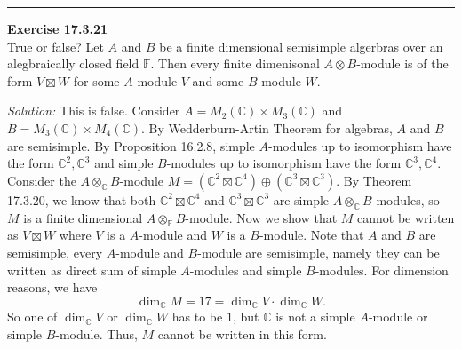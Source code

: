 \documentclass[a4paper, 12pt]{article}
\newenvironment{problem}[2][Exercise]
    { \begin{mdframed}[backgroundcolor=gray!20] \textbf{#1 #2} \\}
    {  \end{mdframed}}
\newenvironment{solution}
    {\textit{Solution:}}
    {}
\begin{document}
\noindent\rule{7in}{2.8pt}
\begin{problem}{17.3.21}
True or false? Let \(A\) and \(B\) be a finite dimensional semisimple algerbras over an alegbraically closed field \(\mathbb{F}\). Then every finite dimenisonal \(A\otimes B\)-module 
is of the form \(V\boxtimes W\) for some \(A\)-module \(V\) and some \(B\)-module \(W\).
\end{problem}
\begin{solution}
This is false. Consider \(A=M_2(\mathbb{C})\times M_3(\mathbb{C})\) and \(B=M_3(\mathbb{C})\times M_4(\mathbb{C})\). By Wedderburn-Artin Theorem for algebras, \(A\) and \(B\) are semisimple. By 
Proposition 16.2.8, simple \(A\)-modules up to isomorphism have the form \(\mathbb{C}^2, \mathbb{C}^3\) and simple \(B\)-modules up to isomorphism have the form \(\mathbb{C}^3, \mathbb{C}^4\). Consider the 
\(A\otimes_\mathbb{C} B\)-module \(M=(\mathbb{C}^2\boxtimes \mathbb{C}^4)\oplus (\mathbb{C}^3\boxtimes \mathbb{C}^3)\). By Theorem 17.3.20, we know that 
both \(\mathbb{C}^2\boxtimes \mathbb{C}^4\) and \(\mathbb{C}^3\boxtimes \mathbb{C}^3\) are simple \(A\otimes_\mathbb{C}B\)-modules, so \(M\) is a finite dimensional \(A\otimes_\mathbb{F}B\)-module. Now we show that 
\(M\) cannot be written as \(V\boxtimes W\) where \(V\) is a \(A\)-module and \(W\) is a \(B\)-module. Note that \(A\) and \(B\) are semisimple,  every \(A\)-module and \(B\)-module are semisimple, namely they can be written as 
direct sum of simple \(A\)-modules and simple \(B\)-modules. For dimension reasons, we have 
\[\dim_\mathbb{C}M=17=\dim_\mathbb{C}V\cdot \dim_\mathbb{C}W.\]
So one of \(\dim_\mathbb{C}V\) or \(\dim_\mathbb{C}W\) has to be \(1\), but \(\mathbb{C}\) is not a simple \(A\)-module or simple \(B\)-module. Thus, \(M\) cannot be written in this form. 
\end{solution}
\end{document}
